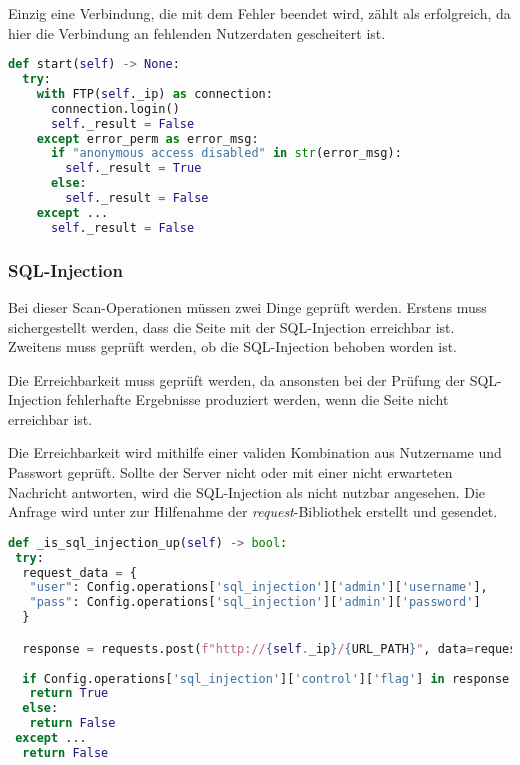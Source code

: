 Einzig eine Verbindung, die mit dem Fehler  beendet wird, zählt als erfolgreich, da hier die Verbindung an fehlenden Nutzerdaten gescheitert ist.
 
\begin{lstlisting}[language=Python, frame=single, caption={Big Brother FTP Scan-Operation}, captionpos=b, label={lst:bigbrother-ftp-save}]
def start(self) -> None:
  try:
    with FTP(self._ip) as connection:
      connection.login()
      self._result = False
    except error_perm as error_msg:
      if "anonymous access disabled" in str(error_msg):
        self._result = True
      else:
        self._result = False
    except ...
      self._result = False
\end{lstlisting} 

\subsubsection{SQL-Injection}

Bei dieser Scan-Operationen müssen zwei Dinge geprüft werden. Erstens muss sichergestellt werden, dass die Seite mit der SQL-Injection erreichbar ist. Zweitens muss geprüft werden, ob die SQL-Injection behoben worden ist. 

Die Erreichbarkeit muss geprüft werden, da ansonsten bei der Prüfung der SQL-Injection fehlerhafte Ergebnisse produziert werden, wenn die Seite nicht erreichbar ist.

Die Erreichbarkeit wird mithilfe einer validen Kombination aus Nutzername und Passwort geprüft. Sollte der Server nicht oder mit einer nicht erwarteten Nachricht antworten, wird die SQL-Injection als nicht nutzbar angesehen. Die Anfrage wird unter zur Hilfenahme der \textit{request}-Bibliothek erstellt und gesendet. 

\begin{lstlisting}[language=Python, frame=single, caption={Big Brother SQL-Injection UP}, captionpos=b, label={lst:bigbrother-sql-injection-up}]
def _is_sql_injection_up(self) -> bool:
 try:
  request_data = {
   "user": Config.operations['sql_injection']['admin']['username'],
   "pass": Config.operations['sql_injection']['admin']['password']
  }

  response = requests.post(f"http://{self._ip}/{URL_PATH}", data=request_data)
  
  if Config.operations['sql_injection']['control']['flag'] in response.text and Config.operations['sql_injection']['control']['value'] in response.text:
   return True
  else:
   return False
 except ...
  return False
\end{lstlisting}

